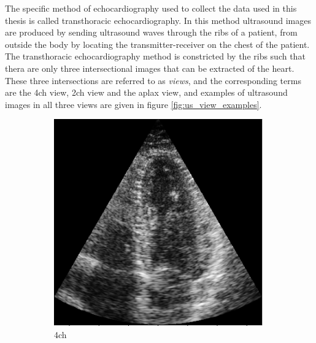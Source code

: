 The specific method of echocardiography used to collect the data used in this thesis is called transthoracic echocardiography. In this method ultrasound images are produced by sending ultrasound waves through the ribs of a patient, from outside the body by locating the transmitter-receiver on the chest of the patient. The transthoracic echocardiography method is constricted by the ribs such that thera are only three intersectional images that can be extracted of the heart. These three intersections are referred to as \textit{views}, and the corresponding terms are the \acrfull{4ch} view, \acrfull{2ch} view and the \acrfull{aplax} view, and examples of ultrasound images in all three views are given in figure \ref{fig:us_view_examples}.

\begin{figure}[H]
    \centering
    \begin{subfigure}[b]{0.3\textwidth} 
        \includegraphics[width=0.99\textwidth]{echocardiography/4ch_frame.png}
        \caption{\acrshort{4ch}}
        \label{fig:us_view_examples_4ch}
    \end{subfigure}
    \begin{subfigure}[b]{0.3\textwidth}

\end{subfigure}
\end{figure}
